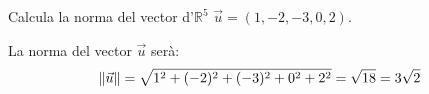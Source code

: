 \Exercise  
Calcula la norma del vector d'$\mathbb{R}^5$ $\vec{u}=(1,-2,-3,0,2)$.

\Answer

La norma del vector $\vec{u}$ serà:
\[\norm{\vec{u}}=\sqrt{1^2+(-2)^2+(-3)^2+0^2+2^2}=\sqrt{18}=3\sqrt{2}\]
\blacksquare 